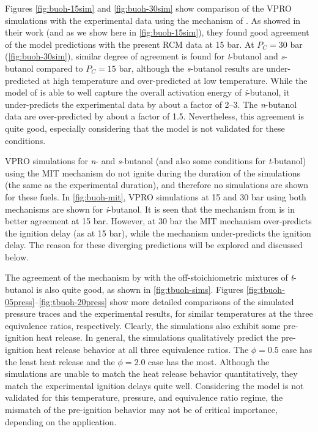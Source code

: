 \documentclass[12pt, letterpaper]{article}
\begin{document}
Figures \ref{fig:buoh-15sim} and \ref{fig:buoh-30sim} show comparison of the
VPRO simulations with the experimental data using the mechanism of
\textcite{Sarathy2012}. As \textcite{Sarathy2012} showed in their work (and as
we show here in \autoref{fig:buoh-15sim}), they found good agreement of the
model predictions with the present RCM data at 15 bar. At $P_C=30$ bar
(\autoref{fig:buoh-30sim}), similar degree of agreement is found for
\textit{t}-butanol and \textit{s}-butanol compared to $P_C=15$ bar, although
the \textit{s}-butanol results are under-predicted at high temperature and
over-predicted at low temperature. While the model of \textcite{Sarathy2012} is
able to well capture the overall activation energy of \textit{i}-butanol, it
under-predicts the experimental data by about a factor of 2–3. The
\textit{n}-butanol data are over-predicted by about a factor of 1.5.
Nevertheless, this agreement is quite good, especially considering that the
model is not validated for these conditions.

VPRO simulations for \textit{n}- and \textit{s}-butanol (and also some
conditions for \textit{t}-butanol) using the MIT mechanism
\cite{Hansen2013,Merchant2013} do not ignite during the duration of the
simulations (the same as the experimental duration), and therefore no
simulations are shown for these fuels. In \autoref{fig:buoh-mit}, VPRO
simulations at 15 and 30 bar using both mechanisms are shown for
\textit{i}-butanol. It is seen that the mechanism from \textcite{Sarathy2012}
is in better agreement at 15 bar. However, at 30 bar the MIT mechanism
\cite{Hansen2013,Merchant2013} over-predicts the ignition delay (as at 15 bar),
while the \textcite{Sarathy2012} mechanism under-predicts the ignition delay.
The reason for these diverging predictions will be explored and discussed below.

The agreement of the mechanism by \textcite{Sarathy2012} with the
off-stoichiometric mixtures of \textit{t}-butanol is also quite good, as shown
in \autoref{fig:tbuoh-sims}. Figures
\ref{fig:tbuoh-05press}--\ref{fig:tbuoh-20press} show more detailed comparisons
of the simulated pressure traces and the experimental results, for similar
temperatures at the three equivalence ratios, respectively. Clearly, the
simulations also exhibit some pre-ignition heat release. In general, the
simulations qualitatively predict the pre-ignition heat release behavior at all
three equivalence ratios. The $\phi=0.5$ case has the least heat release and
the $\phi=2.0$ case has the most. Although the simulations are unable to match
the heat release behavior quantitatively, they match the experimental ignition
delays quite well. Considering the model is not validated for this temperature,
pressure, and equivalence ratio regime, the mismatch of the pre-ignition
behavior may not be of critical importance, depending on the application.
\end{document}
